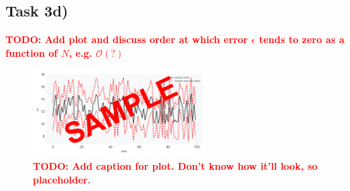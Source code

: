 \documentclass[]{scrartcl}
\begin{document}
\clearpage
\subsection*{Task 3d)}

\textbf{\textcolor{red}{TODO: Add plot and discuss order at which error $\epsilon$ tends to zero as a function of $N$, e.g. $\mathcal{O}(?)$}}

\begin{figure}[htbp!]
	\centering
	\includegraphics[width=0.6\textwidth]{Exercise3Homework3d.png}
	\caption{ \textbf{\textcolor{red}{TODO: Add caption for plot. Don't know how it'll look, so placeholder.}} }
\end{figure}
\end{document}
